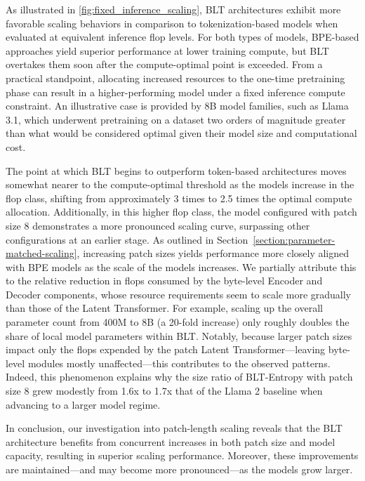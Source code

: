 As illustrated in \autoref{fig:fixed_inference_scaling}, {\textsc BLT} architectures exhibit more favorable scaling behaviors in comparison to tokenization-based models when evaluated at equivalent inference flop levels. For both types of models, BPE-based approaches yield superior performance at lower training compute, but {\textsc BLT} overtakes them soon after the compute-optimal point is exceeded. From a practical standpoint, allocating increased resources to the one-time pretraining phase can result in a higher-performing model under a fixed inference compute constraint. An illustrative case is provided by 8B model families, such as Llama 3.1, which underwent pretraining on a dataset two orders of magnitude greater than what would be considered optimal given their model size and computational cost.

The point at which {\textsc BLT} begins to outperform token-based architectures moves somewhat nearer to the compute-optimal threshold as the models increase in the flop class, shifting from approximately 3 times to 2.5 times the optimal compute allocation. Additionally, in this higher flop class, the model configured with patch size 8 demonstrates a more pronounced scaling curve, surpassing other configurations at an earlier stage. As outlined in Section~\ref{section:parameter-matched-scaling}, increasing patch sizes yields performance more closely aligned with BPE models as the scale of the models increases. We partially attribute this to the relative reduction in flops consumed by the byte-level Encoder and Decoder components, whose resource requirements seem to scale more gradually than those of the Latent Transformer. For example, scaling up the overall parameter count from 400M to 8B (a 20-fold increase) only roughly doubles the share of local model parameters within {\textsc BLT}. Notably, because larger patch sizes impact only the flops expended by the patch Latent Transformer—leaving byte-level modules mostly unaffected—this contributes to the observed patterns. Indeed, this phenomenon explains why the size ratio of {\textsc BLT}-Entropy with patch size 8 grew modestly from 1.6x to 1.7x that of the Llama 2 baseline when advancing to a larger model regime.

In conclusion, our investigation into patch-length scaling reveals that the {\textsc BLT} architecture benefits from concurrent increases in both patch size and model capacity, resulting in superior scaling performance. Moreover, these improvements are maintained—and may become more pronounced—as the models grow larger.

